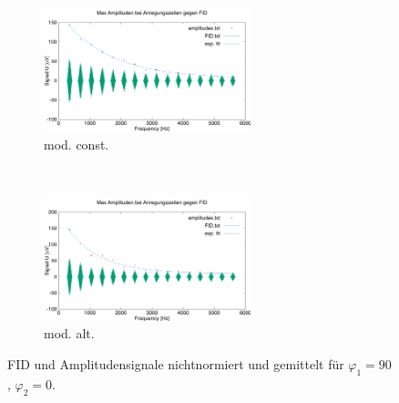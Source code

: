 \documentclass{article}
\begin{document}
        \begin{figure}[h]
            \centering
            \begin{subfigure}[b]{0.4\textwidth}
                \centering
                \includegraphics[width=6cm]{../Bilddateien/CPMG-90-0-constant-avg.png}
                \caption{mod. const.}
                \label{fig:CPMG-90-0-constant-avg}
            \end{subfigure}
            \
            \begin{subfigure}[b]{0.4\textwidth}
                \centering
                \includegraphics[width=6cm]{../Bilddateien/CPMG-90-0-alternating-avg.png}
                \caption{mod. alt.}
                \label{fig:CPMG-90-0-alternating-avg}
            \end{subfigure}
            \caption{FID und Amplitudensignale nichtnormiert und gemittelt für $\varphi_1 = 90$, $\varphi_2 = 0$.}
            \label{fig:CPMG-90-0-avg}
        \end{figure}
\end{document}
